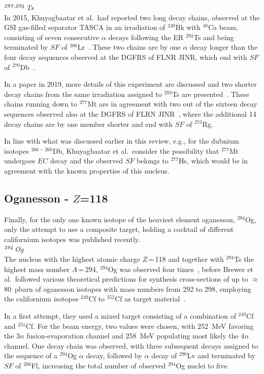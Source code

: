 {\it $^{\it293,294}$Ts}\\
In 2015, Khuyagbaatar et al.~had reported two long decay chains, observed at the GSI gas-filled separator TASCA in an irradiation of $^{249}$Bk with $^{48}$Ca beam, consisting of seven consecutive $\alpha$ decays following the ER $^{294}$Ts and being terminated by $SF$ of $^{266}$Lr~\cite{Khuyagbaatar2015}. 
These two chains are by one $\alpha$ decay longer than the four decay sequences observed at the DGFRS of FLNR JINR, which end with $SF$ of $^{270}$Db~\cite{Oganessian2013b}.

In a paper in 2019, more details of this experiment are discussed and two shorter decay chains from the same irradiation assigned to $^{293}$Ts are presented~\cite{Khuyagbaatar2019}. 
These chains running down to $^{277}$Mt are in agreement with two out of the sixteen decay sequences observed also at the DGFRS of FLRN JINR~\cite{Oganessian2013b}, where the additional 14 decay chains are by one member shorter and end with $SF$ of $^{273}$Rg.

In line with what was discussed earlier in this review, e.g., for the dubnium isotopes $^{266-268}$Db, Khuyagbaatar et al.~consider the possibility that $^{277}$Mt undergoes $EC$ decay and the observed $SF$ belongs to $^{277}$Hs, which would be in agreement with the known properties of this nucleus.\\

\subsection{Oganesson - $Z$=118}\label{Og}
Finally, for the only one known isotope of the heaviest element oganesson, $^{294}$Og, only the attempt to use a composite target, holding a cocktail of different californium isotopes was published recently. \\


 {\it $^{\it294}$Og}\\
The nucleus with the highest atomic charge $Z$\,=\,118 and together with $^{294}$Ts the highest mass number $A$\,=\,294, $^{294}$Og was observed four times~\cite{Oganessian2015}, before Brewer et al.~followed various theoretical predictions for synthesis cross-sections of up to $\approx$80~pbarn of oganesson isotopes with mass numbers from 292 to 298, employing the californium isotopes $^{249}$Cf to $^{252}$Cf as target material~\cite{Brewer2018}. 

In a first attempt, they used a mixed target consisting of a combination of $^{249}$Cf and $^{251}$Cf. 
For the beam energy, two values were chosen, with 252~MeV favoring the 3$n$ fusion-evaporation channel and 258~MeV populating most likely the 4$n$ channel.
One decay chain was observed, with three subsequent decays assigned to the sequence of a $^{294}$Og $\alpha$ decay, followed by $\alpha$ decay of $^{290}$Lv and terminated by $SF$ of $^{286}$Fl, increasing the total number of observed $^{294}$Og nuclei to five.



